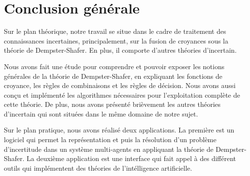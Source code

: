 {}
\chapter*{Conclusion générale}

Sur le plan théorique, notre travail se situe dans le cadre de traitement des connaissances incertaines,
principalement, sur la fusion de croyances sous la théorie de Dempster-Shafer. En plus, il comporte d'autres
théories d'incertain.

Nous avons fait une étude pour comprendre et pouvoir exposer les notions générales de la théorie de Dempster-Shafer,
en expliquant les fonctions de croyance, les règles de combinaisons et les règles de décision. 
Nous avons aussi conçu et implémenté les algorithmes nécessaires pour l'exploitation complète de cette théorie. De plus,
nous avons présenté brièvement les autres théories d'incertain qui sont situées dans le même domaine de notre sujet.

Sur le plan pratique, nous avons réalisé deux applications. La première est un logiciel qui permet la représentation
et puis la résolution d'un problème d'incertitude dans un système multi-agents en appliquant la théorie de Dempster-Shafer.
La deuxième application est une interface qui fait appel à des différent outils qui implémentent des théories de
l'intélligence artificielle.